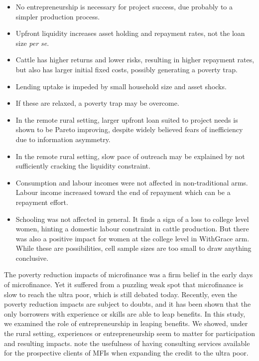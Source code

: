 \begin{mdframed}[style={SecItemize}, frametitle={Conclusion}]
\begin{itemize}
\vspace{1.0ex}\setlength{\itemsep}{1.0ex}\setlength{\baselineskip}{12pt}
\item	No entrepreneurship is necessary for project success, due probably to a simpler production process.
\item	Upfront liquidity increases asset holding and repayment rates, not the loan size \textit{per se}.
\item	Cattle has higher returns and lower risks, resulting in higher repayment rates, but also has larger initial fixed costs, possibly generating a poverty trap.
\item	Lending uptake is impeded by small household size and asset shocks.
\item	If these are relaxed, a poverty trap may be overcome.
\item	In the remote rural setting, larger upfront loan suited to project needs is shown to be Pareto improving, despite widely believed fears of inefficiency due to information asymmetry.
\item	In the remote rural setting, slow pace of outreach may be explained by not sufficiently cracking the liquidity constraint.
\item	Consumption and labour incomes were not affected in non-\textsf{traditional} arms. Labour income increased toward the end of repayment which can be a repayment effort.
\item	Schooling was not affected in general. It finds a sign of a loss to college level women, hinting a domestic labour constraint in cattle production. But there was also a positive impact for women at the college level in \textsf{WithGrace} arm. While these are possibilities, cell sample sizes are too small to draw anything conclusive.
\end{itemize}
\end{mdframed}

	The poverty reduction impacts of microfinance was a firm belief in the early days of microfinance. Yet it suffered from a puzzling weak spot that microfinance is slow to reach the ultra poor, which is still debated today. Recently, even the poverty reduction impacts are subject to doubts, and it has been shown that the only borrowers with experience or skills are able to leap benefits. In this study, we examined the role of entrepreneurship in leaping benefits. We showed, under the rural setting, experiences or entrepreneurship seem to matter for participation and resulting impacts. note the usefulness of having consulting services available for the prospective clients of MFIs when expanding the credit to the ultra poor. 

